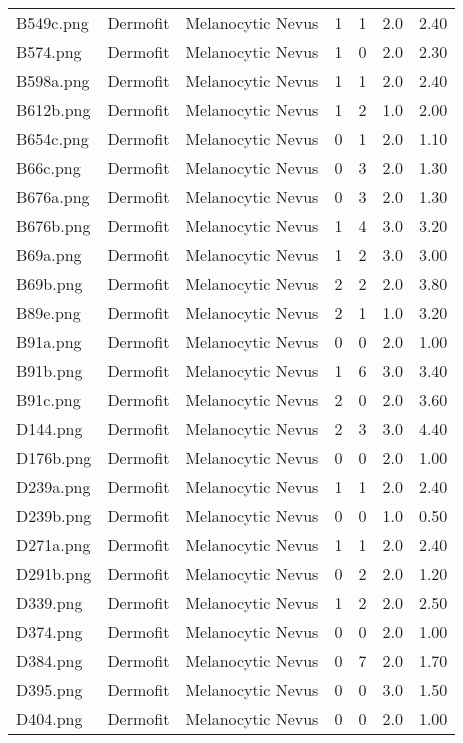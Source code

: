 \begin{longtable}{ | l | l | l | l | l | l | l |}
B549c.png & Dermofit & Melanocytic Nevus & 1 & 1 & 2.0 & 2.40 \\ 
B574.png & Dermofit & Melanocytic Nevus & 1 & 0 & 2.0 & 2.30 \\ 
B598a.png & Dermofit & Melanocytic Nevus & 1 & 1 & 2.0 & 2.40 \\ 
B612b.png & Dermofit & Melanocytic Nevus & 1 & 2 & 1.0 & 2.00 \\ 
B654c.png & Dermofit & Melanocytic Nevus & 0 & 1 & 2.0 & 1.10 \\ 
B66c.png & Dermofit & Melanocytic Nevus & 0 & 3 & 2.0 & 1.30 \\ 
B676a.png & Dermofit & Melanocytic Nevus & 0 & 3 & 2.0 & 1.30 \\ 
B676b.png & Dermofit & Melanocytic Nevus & 1 & 4 & 3.0 & 3.20 \\ 
B69a.png & Dermofit & Melanocytic Nevus & 1 & 2 & 3.0 & 3.00 \\ 
B69b.png & Dermofit & Melanocytic Nevus & 2 & 2 & 2.0 & 3.80 \\ 
B89e.png & Dermofit & Melanocytic Nevus & 2 & 1 & 1.0 & 3.20 \\ 
B91a.png & Dermofit & Melanocytic Nevus & 0 & 0 & 2.0 & 1.00 \\ 
B91b.png & Dermofit & Melanocytic Nevus & 1 & 6 & 3.0 & 3.40 \\ 
B91c.png & Dermofit & Melanocytic Nevus & 2 & 0 & 2.0 & 3.60 \\ 
D144.png & Dermofit & Melanocytic Nevus & 2 & 3 & 3.0 & 4.40 \\ 
D176b.png & Dermofit & Melanocytic Nevus & 0 & 0 & 2.0 & 1.00 \\ 
D239a.png & Dermofit & Melanocytic Nevus & 1 & 1 & 2.0 & 2.40 \\ 
D239b.png & Dermofit & Melanocytic Nevus & 0 & 0 & 1.0 & 0.50 \\ 
D271a.png & Dermofit & Melanocytic Nevus & 1 & 1 & 2.0 & 2.40 \\ 
D291b.png & Dermofit & Melanocytic Nevus & 0 & 2 & 2.0 & 1.20 \\ 
D339.png & Dermofit & Melanocytic Nevus & 1 & 2 & 2.0 & 2.50 \\ 
D374.png & Dermofit & Melanocytic Nevus & 0 & 0 & 2.0 & 1.00 \\ 
D384.png & Dermofit & Melanocytic Nevus & 0 & 7 & 2.0 & 1.70 \\ 
D395.png & Dermofit & Melanocytic Nevus & 0 & 0 & 3.0 & 1.50 \\ 
D404.png & Dermofit & Melanocytic Nevus & 0 & 0 & 2.0 & 1.00 \\ 

\end{longtable}
